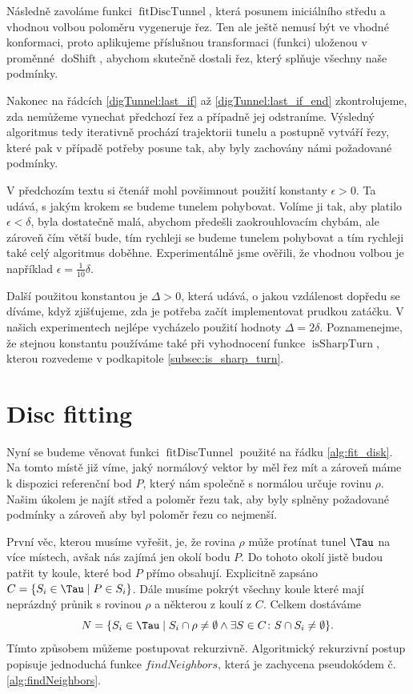 Následně zavoláme funkci $ \operatorname{fitDiscTunnel} $, která posunem iniciálního
středu a vhodnou volbou poloměru vygeneruje řez. Ten ale ještě nemusí být ve vhodné
konformaci, proto aplikujeme příslušnou transformaci (funkci) uloženou v proměnné
$ \operatorname{doShift} $, abychom skutečně dostali řez, který splňuje všechny
naše podmínky.

Nakonec na řádcích \ref{digTunnel:last_if} až \ref{digTunnel:last_if_end}
zkontrolujeme, zda nemůžeme vynechat předchozí řez a případně jej odstraníme.
Výsledný algoritmus tedy iterativně prochází trajektorii tunelu a postupně vytváří řezy,
které pak v případě potřeby posune tak, aby byly zachovány námi požadované podmínky.

V předchozím textu si čtenář mohl povšimnout použití konstanty $ \epsilon > 0$.
Ta udává, s jakým krokem se budeme tunelem pohybovat.
Volíme ji tak, aby platilo  $ \epsilon < \delta $, byla dostatečně malá, abychom
předešli zaokrouhlovacím chybám, ale zároveň čím větší bude, tím rychleji se
budeme tunelem pohybovat a tím rychleji také celý algoritmus doběhne. Experimentálně
jsme ověřili, že vhodnou volbou je například $ \epsilon = \frac{1}{10} \delta $.

Další použitou konstantou je $ \Delta > 0$, která udává, o jakou vzdálenost dopředu
se díváme, když zjišťujeme, zda je potřeba začít implementovat prudkou zatáčku.
V našich experimentech nejlépe vycházelo použití hodnoty $ \Delta = 2 \delta $.
Poznamenejme, že stejnou konstantu používáme také při vyhodnocení funkce
$ \operatorname{isSharpTurn} $, kterou rozvedeme v podkapitole \ref{subsec:is_sharp_turn}.




\section{Disc fitting} \label{subsec:disk_fit}
Nyní se budeme věnovat funkci $ \operatorname{fitDiscTunnel} $ použité na řádku
\ref{alg:fit_disk}. Na tomto místě již víme, jaký normálový vektor by měl řez mít a
zároveň máme k dispozici referenční bod $ P $, který nám společně s normálou
určuje rovinu $ \rho $. Našim úkolem je najít střed a poloměr řezu tak, aby
byly splněny požadované podmínky a zároveň aby byl poloměr řezu co nejmenší.

První věc, kterou musíme vyřešit, je, že rovina $ \rho $ může protínat tunel $ \Tau $
na více místech, avšak nás zajímá jen okolí bodu $ P $. Do tohoto okolí jistě
budou patřit ty koule, které bod $ P $ přímo obsahují. Explicitně
zapsáno $ C = \{S_i \in \Tau \mid P \in S_i \} $. Dále musíme pokrýt všechny
koule které mají neprázdný průnik s rovinou $ \rho $ a některou z koulí z $ C $.
Celkem dostáváme
$$ N = \{ S_i \in \Tau \mid S_i \cap \rho \neq \emptyset \wedge \exists S \in C \colon S \cap S_i \neq \emptyset  \}.$$
Tímto způsobem můžeme postupovat rekurzivně. Algoritmický rekurzivní postup
popisuje jednoduchá funkce $ findNeighbors $, která je zachycena pseudokódem
č. \ref{alg:findNeighbors}.

